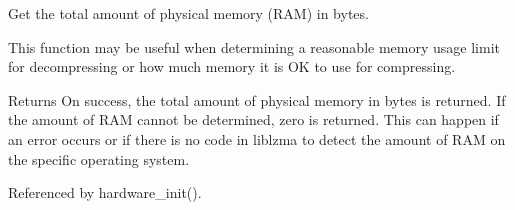 Get the total amount of physical memory (R\+AM) in bytes. 

This function may be useful when determining a reasonable memory usage limit for decompressing or how much memory it is OK to use for compressing.

\begin{DoxyReturn}{Returns}
On success, the total amount of physical memory in bytes is returned. If the amount of R\+AM cannot be determined, zero is returned. This can happen if an error occurs or if there is no code in liblzma to detect the amount of R\+AM on the specific operating system. 
\end{DoxyReturn}


Referenced by hardware\+\_\+init().

